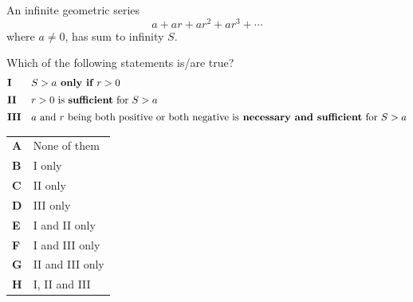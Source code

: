 \documentclass[11pt,a4paper]{article}
\begin{document}
\begin{enumerate}[label=\textbf{\arabic*.},leftmargin=*,itemsep=0pt,start=4]
\questionitem[Logic]
An infinite geometric series
\[
a + ar + ar^2 + ar^3 + \cdots
\]
where $a \ne 0$, has sum to infinity $S$.

Which of the following statements is/are true?
\[
\begin{array}{@{}ll@{}}
\textbf{I} & S > a \textbf{ only if } r > 0 \\[5pt]
\textbf{II} & r > 0 \text{ is }\textbf{sufficient}\text{ for } S>a  \\[5pt]
\textbf{III} & a \text{ and } r \text{ being both positive or both negative is}\textbf{ necessary and sufficient} \text{ for } S > a
\end{array}
\]

\par\vspace*{12pt}
\begin{tabularx}{\linewidth}{@{}>{\bfseries}l Y@{}}
A &
None of them
\\[0.8em]
B &
I only
\\[0.8em]
C &
II only
\\[0.8em]
D &
III only
\\[0.8em]
E &
I and II only
\\[0.8em]
F &
I and III only
\\[0.8em]
G &
II and III only
\\[0.8em]
H &
I, II and III
\\
\end{tabularx}
\end{enumerate}
\clearpage
\thispagestyle{djspaper}
\vspace*{8pt}
\end{document}
